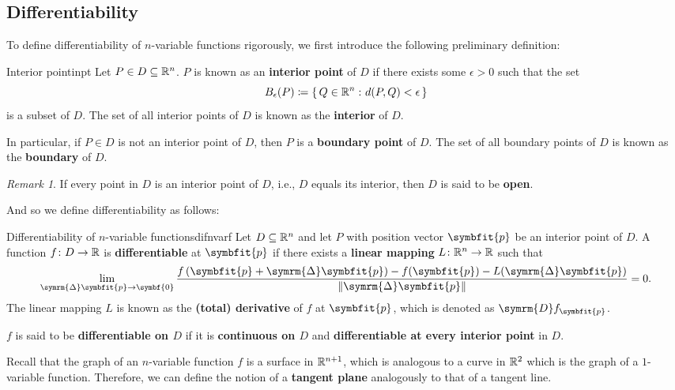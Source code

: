 \documentclass[math]{amznotes}
\theoremstyle{remark}
\newtheorem*{remark}{Remark}
\begin{document}
\subsection{Differentiability}
To define differentiability of $n$-variable functions rigorously, we first introduce the following preliminary definition:
\begin{dfnbox}{Interior point}{inpt}
    Let $P \in D \subseteq \mathbb{R}^n$. $P$ is known as an {\color{red} \textbf{interior point}} of $D$ if there exists some $\epsilon > 0$ such that the set
    \begin{displaymath}
        B_\epsilon(P) \coloneq \left\{ \, Q \in \mathbb{R}^n \,\colon d(P, Q) < \epsilon \, \right\}
    \end{displaymath}
    is a subset of $D$. The set of all interior points of $D$ is known as the {\color{red} \textbf{interior}} of $D$.

    In particular, if $P \in D$ is not an interior point of $D$, then $P$ is a {\color{red} \textbf{boundary point}} of $D$. The set of all boundary points of $D$ is known as the {\color{red} \textbf{boundary}} of $D$.
\end{dfnbox}
\begin{notebox}
    \begin{remark}
        If every point in $D$ is an interior point of $D$, i.e., $D$ equals its interior, then $D$ is said to be {\color{red} \textbf{open}}.
    \end{remark}
\end{notebox}
And so we define differentiability as follows:
\begin{dfnbox}{Differentiability of $n$-variable functions}{difnvarf}
    Let $D \subseteq \mathbb{R}^n$ and let $P$ with position vector $\symbfit{p}$ be an interior point of $D$. A function $f \colon D \to \mathbb{R}$ is {\color{red} \textbf{differentiable}} at $\symbfit{p}$ if there exists a {\color{red} \textbf{linear mapping}} $L \colon \mathbb{R}^n \to \mathbb{R}$ such that
    \begin{equation*}
        \lim_{\symrm{\Delta}\symbfit{p} \to \symbf{0}}\frac{f \left(\symbfit{p} + \symrm{\Delta}\symbfit{p}\right) - f(\symbfit{p}) - L(\symrm{\Delta}\symbfit{p})}{\left\lVert \symrm{\Delta}\symbfit{p} \right\rVert} = 0.
    \end{equation*}
    The linear mapping $L$ is known as the {\color{red} \textbf{(total) derivative}} of $f$ at $\symbfit{p}$, which is denoted as $\symrm{D}f_{\symbfit{p}}$.

    $f$ is said to be {\color{red} \textbf{differentiable on $D$}} if it is {\color{red} \textbf{continuous on $D$}} and {\color{red} \textbf{differentiable at every interior point}} in $D$.
\end{dfnbox}
Recall that the graph of an $n$-variable function $f$ is a surface in $\mathbb{R}^{n + 1}$, which is analogous to a curve in $\mathbb{R}^2$ which is the graph of a $1$-variable function. Therefore, we can define the notion of a {\color{red} \textbf{tangent plane}} analogously to that of a tangent line.
\end{document}
